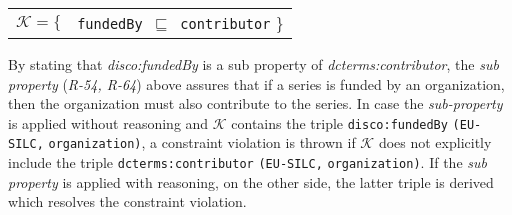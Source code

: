 \documentclass{llncs}
\newcommand{\ms}[1]{\texttt{#1}}
\newenvironment{DL}{
  \small
  \vspace{0cm}
	\begin{center}
  \begin{tabular}{c l}

}{
  \end{tabular}
	\end{center}
}
\begin{document}
{{%


\begin{center}
\begin{DL} 
$\mathcal{K}=\{$ 
  &\ms{fundedBy $\sqsubseteq$ contributor}
 \}\\ 
\end{DL}
\end{center}

By stating that \emph{disco:fundedBy} is a sub property of \emph{dcterms:contributor},
the {\em sub property} (\emph{R-54, R-64}) above assures that if a series is funded by an organization, then the organization must also contribute to the series.
In case the \emph{sub-property} is applied without reasoning and $\mathcal{K}$ contains the triple \ms{disco:fundedBy} \ms{(EU-SILC,} \ms{organization)},
a constraint violation is thrown if $\mathcal{K}$ does not explicitly include the triple \ms{dcterms:contributor} \ms{(EU-SILC,} \ms{organization)}.
If the \emph{sub property} is applied with reasoning, on the other side, the latter triple is derived which resolves the constraint violation.

}}
\end{document}
